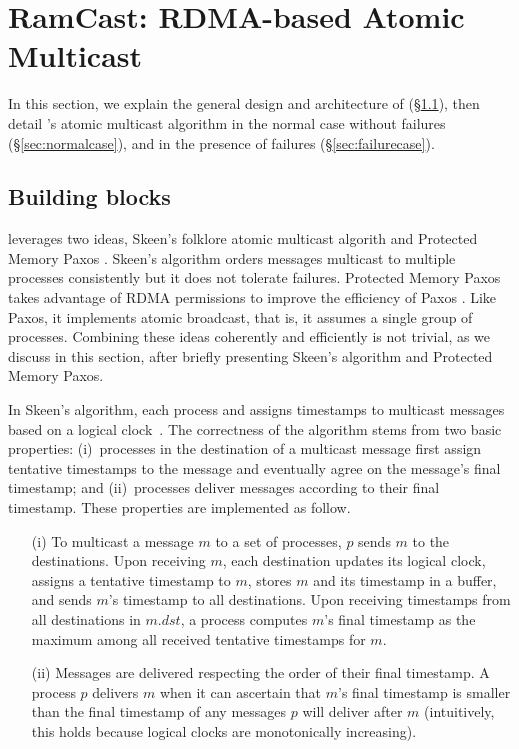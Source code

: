 
\section{RamCast: RDMA-based Atomic Multicast}
\label{sec:rdma-atomic-multicast}

In this section, we explain the general design and architecture of \libname (\S\ref{sec:overview}), then detail \libname's atomic multicast algorithm in the normal case without failures (\S\ref{sec:normalcase}), and in the presence of failures (\S\ref{sec:failurecase}).

\subsection{Building blocks}
\label{sec:overview}

\libname leverages two ideas, Skeen's folklore atomic multicast algorith \cite{BJ87b} and Protected Memory Paxos \cite{Aguilera2019}.
Skeen's algorithm orders messages multicast to multiple processes consistently but it does not tolerate failures.
Protected Memory Paxos takes advantage of RDMA permissions to improve the efficiency of Paxos \cite{L98}. 
Like Paxos, it implements atomic broadcast, that is, it assumes a single group of processes.
Combining these ideas coherently and efficiently is not trivial, as we discuss in this section,
after briefly presenting Skeen's algorithm and Protected Memory Paxos.


In Skeen's algorithm, each process and assigns timestamps to multicast messages based on a logical clock~\cite{Lam78}.
The correctness of the algorithm stems from two basic properties:
(i)~processes in the destination of a multicast message first assign tentative timestamps to the message and eventually agree on the message's final timestamp; and
(ii)~processes deliver messages according to their final timestamp.
These properties are implemented as follow.

\begin{itemize}
\item[(i)] To multicast a message $m$ to a set of processes, $p$ sends $m$ to the destinations.
Upon receiving $m$, each destination updates its logical clock, assigns a tentative timestamp to $m$, stores $m$ and its timestamp in a buffer, and sends $m$'s timestamp to all destinations.
Upon receiving timestamps from all destinations in $m.dst$, a process computes $m$'s final timestamp as the maximum among all received tentative timestamps for $m$.
\item[(ii)]Messages are delivered respecting the order of their final timestamp.
A process $p$ delivers $m$ when it can ascertain that $m$'s final timestamp is smaller than the final timestamp of any messages $p$ will deliver after $m$ (intuitively, this holds because logical clocks are monotonically increasing).
\end{itemize}

